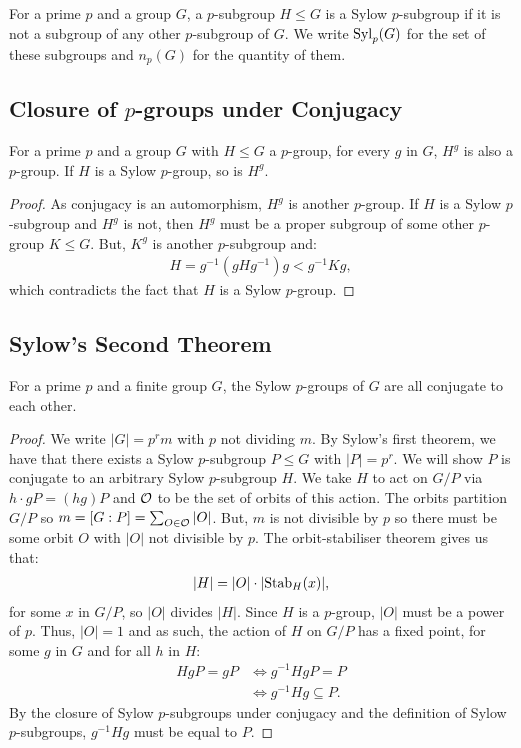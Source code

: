 For a prime $p$ and a group $G$, a $p$-subgroup $H \leq G$
is a Sylow $p$-subgroup if it is not a subgroup of any other
$p$-subgroup of $G$. We write $\operatorname{Syl}_p(G)$ for the set of
these subgroups and $n_p(G)$ for the quantity of them.

\subsection{Closure of $p$-groups under Conjugacy}  \label{6.5}

For a prime $p$ and a group $G$ with $H \leq G$ a $p$-group,
for every $g$ in $G$, $H^g$ is also a $p$-group.
If $H$ is a Sylow $p$-group, so is $H^g$. 

\begin{proof}
    As conjugacy is an automorphism, $H^g$ is another $p$-group.
    If $H$ is a Sylow $p$-subgroup and $H^g$ is not, then $H^g$ 
    must be a proper subgroup of some other $p$-group $K \leq G$.
    But, $K^g$ is another $p$-subgroup and: \begin{align*}
        H = g^{-1}(gHg^{-1})g < g^{-1}Kg,
    \end{align*} which contradicts the fact that $H$ is a
    Sylow $p$-group.
\end{proof}

\subsection{Sylow's Second Theorem}  \label{6.6}

For a prime $p$ and a finite group $G$, the Sylow $p$-groups
of $G$ are all conjugate to each other.

\begin{proof}
    We write $|G| = p^rm$ with $p$ not dividing $m$.
    By Sylow's first theorem, we have that there exists
    a Sylow $p$-subgroup $P \leq G$ with $|P| = p^r$.
    We will show $P$ is conjugate to an arbitrary Sylow
    $p$-subgroup $H$.
    We take $H$ to act on $G / P$ via $h \cdot gP = (hg)P$
    and $\mathcal{O}$ to be the set of orbits of this action.
    The orbits partition $G / P$ so 
    $m = [G : P] = \sum_{O \in \mathcal{O}} |O|$. But, $m$
    is not divisible by $p$ so there must be some orbit
    $O$ with $|O|$ not divisible by $p$.
    The orbit-stabiliser theorem gives us that: \begin{align*}
        |H| = |O| \cdot |\!\operatorname{Stab}_H(x)|,
    \end{align*} for some $x$ in $G / P$, so $|O|$ divides
    $|H|$. Since $H$ is a $p$-group, $|O|$ must be a power
    of $p$. Thus, $|O| = 1$ and as such, the action of $H$ on 
    $G / P$ has a fixed point, for some $g$ in $G$ and for 
    all $h$ in $H$: \begin{align*}
        HgP = gP
        & \Longleftrightarrow g^{-1}HgP = P \\
        & \Longleftrightarrow g^{-1}Hg \subseteq P.
    \end{align*} By the closure of Sylow $p$-subgroups under
    conjugacy and the definition of Sylow $p$-subgroups, 
    $g^{-1}Hg$ must be equal to $P$.
\end{proof}

